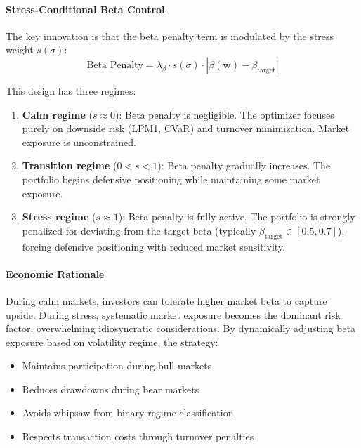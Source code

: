 \paragraph{Stress-Conditional Beta Control}

The key innovation is that the beta penalty term is modulated by the stress weight $s(\sigma)$:
\[
\text{Beta Penalty} = \lambda_\beta \cdot s(\sigma) \cdot |\beta(\mathbf{w}) - \beta_{\text{target}}|
\]

This design has three regimes:

\begin{enumerate}
  \item \textbf{Calm regime} ($s \approx 0$): Beta penalty is negligible. The optimizer focuses purely on downside risk (LPM1, CVaR) and turnover minimization. Market exposure is unconstrained.

  \item \textbf{Transition regime} ($0 < s < 1$): Beta penalty gradually increases. The portfolio begins defensive positioning while maintaining some market exposure.

  \item \textbf{Stress regime} ($s \approx 1$): Beta penalty is fully active. The portfolio is strongly penalized for deviating from the target beta (typically $\beta_{\text{target}} \in [0.5, 0.7]$), forcing defensive positioning with reduced market sensitivity.
\end{enumerate}

\paragraph{Economic Rationale}

During calm markets, investors can tolerate higher market beta to capture upside. During stress, systematic market exposure becomes the dominant risk factor, overwhelming idiosyncratic considerations. By dynamically adjusting beta exposure based on volatility regime, the strategy:

\begin{itemize}
  \item Maintains participation during bull markets
  \item Reduces drawdowns during bear markets
  \item Avoids whipsaw from binary regime classification
  \item Respects transaction costs through turnover penalties
\end{itemize}

